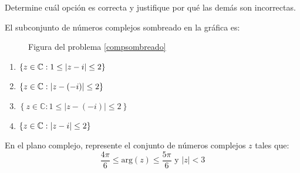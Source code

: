 \begin{prob}\label{compsombreado}
Determine cuál opción es correcta y justifique por qué las demás son incorrectas.

El subconjunto de números complejos sombreado en la gráfica es:


\begin{figure}[H]
\centering 		
{}
\caption{Figura del problema \ref{compsombreado}}
\end{figure} 
\begin{multicols}{2}
\begin{enumerate}[$(a)$]
\item  $\left\lbrace z\in \mathbb{C}: 1\leq\left\vert z-i\right\vert\leq 2 \right\rbrace$
\item  $\left\lbrace z\in \mathbb{C}:  \left\vert z-(-i)\right\vert\leq 2 \right\rbrace$
\item $\left\lbrace z\in\mathbb{C}:1\leq|z-(-i)|\leq 2\right\rbrace$
\item  $\left\lbrace z\in \mathbb{C}:  \left\vert z-i\right\vert\leq 2 \right\rbrace$
\end{enumerate}
\end{multicols}
\end{prob}

\begin{prob} En el plano complejo, represente el conjunto de números complejos $z$ tales que:
$$\dfrac{4\pi}{6}\leq\text{arg}(z)\leq\dfrac{5\pi}{6} \text{ y } |z|<3$$
\end{prob}

